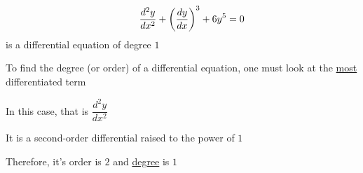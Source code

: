 \documentclass[14pt,fleqn]{extarticle}
\begin{document}
 
\begin{snippet}
    \correct
    
    \[ \qquad \frac{d^2y}{dx^2} + \left(\frac{dy}{dx} \right)^3 + 6y^5 = 0 \]
    is a differential equation of degree $1$
    
    \reason
    
    To find the degree (or order) of a differential equation, one must look at 
    the \underline{most} differentiated term\newline 
    
    In this case, that is $\dfrac{d^2 y}{dx^2}$ \newline 
    
    It is a second-order differential raised to the power of $1$\newline 
    
    Therefore, it's order is $2$ and \underline{degree} is $1$
    
\end{snippet} 
\end{document}
